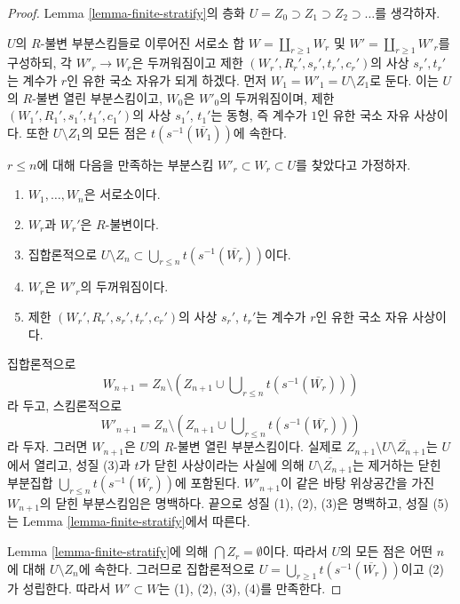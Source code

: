 \begin{proof}
Lemma \ref{lemma-finite-stratify}의 층화
$U = Z_0 \supset Z_1 \supset Z_2 \supset \ldots$를 생각하자.

\medskip\noindent
$U$의 $R$-불변 부분스킴들로 이루어진 서로소 합
$W = \coprod_{r \geq 1} W_r$ 및 $W' = \coprod_{r \geq 1} W'_r$를
구성하되, 각 $W'_r \to W_r$은 두꺼워짐이고 제한
$(W_r', R_r', s_r', t_r', c_r')$의 사상 $s_r', t_r'$는 계수가 $r$인
유한 국소 자유가 되게 하겠다. 먼저 $W_1 = W'_1 = U \setminus Z_1$로 둔다.
이는 $U$의 $R$-불변 열린 부분스킴이고, $W_0$은 $W'_0$의 두꺼워짐이며,
제한 $(W_1', R_1', s_1', t_1', c_1')$의 사상 $s_1'$, $t_1'$는
동형, 즉 계수가 $1$인 유한 국소 자유 사상이다. 또한
$U \setminus Z_1$의 모든 점은 $t(s^{-1}(\overline{W_1}))$에 속한다.

\medskip\noindent
$r \leq n$에 대해 다음을 만족하는 부분스킴
$W'_r \subset W_r \subset U$를 찾았다고 가정하자.
\begin{enumerate}
\item $W_1, \ldots, W_n$은 서로소이다.
\item $W_r$과 $W_r'$은 $R$-불변이다.
\item 집합론적으로
$U \setminus Z_n \subset \bigcup_{r \leq n} t(s^{-1}(\overline{W_r}))$이다.
\item $W_r$은 $W'_r$의 두꺼워짐이다.
\item 제한 $(W_r', R_r', s_r', t_r', c_r')$의 사상 $s_r'$, $t_r'$는
계수가 $r$인 유한 국소 자유 사상이다.
\end{enumerate}
집합론적으로
$$
W_{n + 1} = Z_n \setminus
\left(
Z_{n + 1} \cup \bigcup\nolimits_{r \leq n} t(s^{-1}(\overline{W_r}))
\right)
$$
라 두고, 스킴론적으로
$$
W'_{n + 1} = Z_n \setminus
\left(
Z_{n + 1} \cup \bigcup\nolimits_{r \leq n} t(s^{-1}(\overline{W_r}))
\right)
$$
라 두자. 그러면 $W_{n + 1}$은 $U$의 $R$-불변 열린 부분스킴이다.
실제로 $Z_{n + 1} \setminus \overline{U \setminus Z_{n + 1}}$는 $U$에서
열리고, 성질 (3)과 $t$가 닫힌 사상이라는 사실에 의해
$\overline{U \setminus Z_{n + 1}}$는 제거하는 닫힌 부분집합
$\bigcup\nolimits_{r \leq n} t(s^{-1}(\overline{W_r}))$에 포함된다.
$W'_{n + 1}$이 같은 바탕 위상공간을 가진 $W_{n + 1}$의 닫힌 부분스킴임은
명백하다. 끝으로 성질 (1), (2), (3)은 명백하고, 성질 (5)는 Lemma
\ref{lemma-finite-stratify}에서 따른다.

\medskip\noindent
Lemma \ref{lemma-finite-stratify}에 의해 $\bigcap Z_r = \emptyset$이다.
따라서 $U$의 모든 점은 어떤 $n$에 대해 $U \setminus Z_n$에 속한다.
그러므로 집합론적으로
$U = \bigcup_{r \geq 1} t(s^{-1}(\overline{W_r}))$이고 (2)가 성립한다.
따라서 $W' \subset W$는 (1), (2), (3), (4)를 만족한다.
\end{proof}

